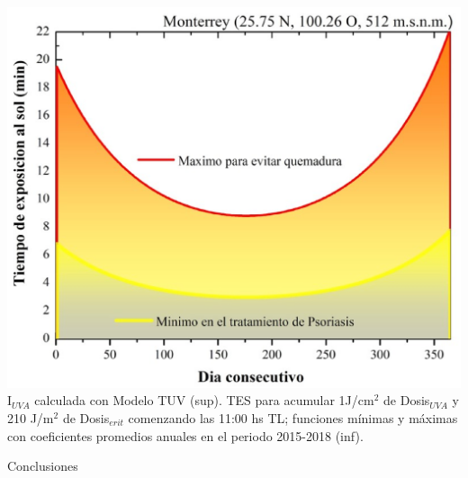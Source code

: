 \documentclass{article}
\begin{document}
\begin{multicols}{2}
\includegraphics[scale=0.39]{images/ecua.eps}
\changefontsizes{10pt}
\textcolor{na}{I$_{UVA}$ calculada con Modelo TUV (sup). TES para acumular 1J/cm$^2$ de Dosis$_{UVA}$ y 210 J/m$^2$ de Dosis$_{erit}$ comenzando las 11:00 hs TL; funciones mínimas y máximas con coeficientes promedios anuales en el periodo 2015-2018 (inf).}
\changefontsizes{12pt}
\begin{center}
\begin{shaded}
\changefontsizes{12pt}
\textcolor{na}{Conclusiones}
\end{shaded}
\end{center}
\begin{minipage}{0.22\linewidth}

\end{minipage}
\end{multicols}
\end{document}
